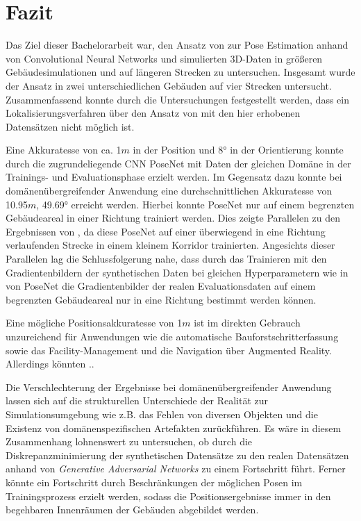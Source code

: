 
\section{Fazit}
\label{sec:kapitel_6}
Das Ziel dieser Bachelorarbeit war, den Ansatz von \citet{acharyaBIMPoseNetIndoorCamera2019} zur Pose Estimation anhand von Convolutional Neural Networks und simulierten 3D-Daten in größeren Gebäudesimulationen und auf längeren Strecken zu untersuchen.
Insgesamt wurde der Ansatz in zwei unterschiedlichen Gebäuden auf vier Strecken untersucht. Zusammenfassend konnte durch die Untersuchungen festgestellt werden, dass ein Lokalisierungsverfahren über den Ansatz von \citet{acharyaBIMPoseNetIndoorCamera2019} mit den hier erhobenen Datensätzen nicht möglich ist.


Eine Akkuratesse von ca. 1$m$ in der Position und 8° in der Orientierung konnte durch die zugrundeliegende CNN PoseNet mit Daten der gleichen Domäne in der Trainings- und Evaluationsphase erzielt werden. Im Gegensatz dazu konnte bei domänenübergreifender Anwendung eine durchschnittlichen Akkuratesse von 10.95$m$, 49.69° erreicht werden. Hierbei konnte PoseNet nur auf einem begrenzten Gebäudeareal in einer Richtung trainiert werden. Dies zeigte Parallelen zu den Ergebnissen von \citet{acharyaBIMPoseNetIndoorCamera2019}, da diese PoseNet auf einer überwiegend in eine Richtung verlaufenden Strecke in einem kleinem Korridor trainierten. Angesichts dieser Parallelen lag die Schlussfolgerung nahe, dass durch das Trainieren mit den Gradientenbildern der synthetischen Daten bei gleichen Hyperparametern wie in \cite{acharyaBIMPoseNetIndoorCamera2019} von PoseNet die Gradientenbilder der realen Evaluationsdaten auf einem begrenzten Gebäudeareal nur in eine Richtung bestimmt werden können.

Eine mögliche Positionsakkuratesse von 1$m$ ist im direkten Gebrauch unzureichend für Anwendungen wie die automatische Bauforstschritterfassung sowie das Facility-Manage\-ment und die Navigation über Augmented Reality. Allerdings könnten ..


Die Verschlechterung der Ergebnisse bei domänenübergreifender Anwendung lassen sich auf die strukturellen Unterschiede der Realität zur Simulationsumgebung wie z.B. das Fehlen von diversen Objekten und die Existenz von domänenspezifischen Artefakten zurückführen. Es wäre in diesem Zusammenhang lohnenswert zu untersuchen, ob durch die Diskrepanzminimierung der synthetischen Datensätze zu den realen Datensätzen anhand von \textit{Generative Adversarial Networks} zu einem Fortschritt führt. Ferner könnte ein Fortschritt durch Beschränkungen der möglichen Posen im Trainingsprozess erzielt werden, sodass die Positionsergebnisse immer in den begehbaren Innenräumen der Gebäuden abgebildet werden.

